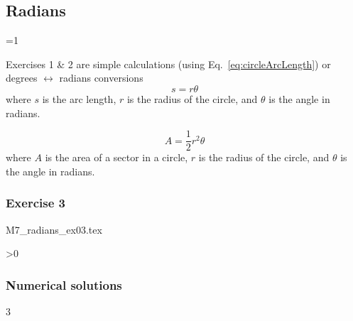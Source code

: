 \subsection{Radians}

\ifnum \value{printWorkedSols}=1 

Exercises 1 \& 2 are simple calculations 
(using Eq.~\ref{eq:circleArcLength}) 
or degrees $\leftrightarrow$ radians conversions
\begin{equation}
	s = r\theta
	\label{eq:circleArcLength}
\end{equation}
where $s$ is the arc length, 
$r$ is the radius of the circle, 
and $\theta$ is the angle in radians.

\begin{equation}
	A = \frac{1}{2} r^{2} \theta
	\label{eq:circleSectorArea}
\end{equation}
where $A$ is the area of a sector in a circle, 
$r$ is the radius of the circle, 
and $\theta$ is the angle in radians.

\fi

\subsubsection{Exercise 3}
\begin{questions}

{M7_radians_ex03.tex}

\ifnum\value{printSols}>0
	\subsubsection*{Numerical solutions}
	\setcounter{solNo}{2}
	\begin{enumerate}
	\end{enumerate}
	\else
\fi

\end{questions}